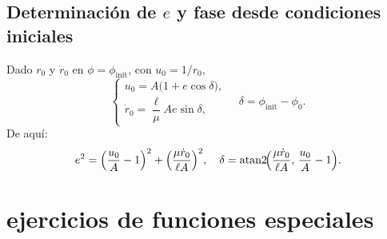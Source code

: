 \documentclass{article}
\begin{document}
\subsection*{Determinación de \(e\) y fase desde condiciones iniciales}
Dado \(r_0\) y \(\dot r_0\) en \(\phi=\phi_{\mathrm{init}}\), con \(u_0=1/r_0\),
\[
\begin{cases}
u_0 = A\bigl(1 + e\cos\delta\bigr),\\[4pt]
\dot r_0 = \dfrac{\ell}{\mu}A e\sin\delta,
\end{cases}
\quad \delta = \phi_{\mathrm{init}} - \phi_0.
\]
De aquí:
\[
e^2 = \Bigl(\frac{u_0}{A}-1\Bigr)^2 + \Bigl(\frac{\mu\dot r_0}{\ell A}\Bigr)^2,
\quad
\delta = \operatorname{atan2}\!\Bigl(\frac{\mu\dot r_0}{\ell A},\,\frac{u_0}{A}-1\Bigr).
\]


\section{ejercicios de funciones especiales}
\end{document}
